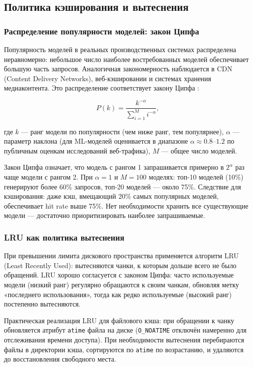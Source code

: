 \subsection{Политика кэширования и вытеснения}

\subsubsection{Распределение популярности моделей: закон Ципфа}

Популярность моделей в реальных производственных системах распределена неравномерно: небольшое число наиболее востребованных моделей обеспечивает большую часть запросов. Аналогичная закономерность наблюдается в CDN (Content Delivery Networks), веб-кэшировании и системах хранения медиаконтента. Это распределение соответствует закону Ципфа \cite{zipf_law}:

\begin{equation}
P(k) = \frac{k^{-\alpha}}{\sum_{i=1}^{M} i^{-\alpha}},
\label{eq:zipf}
\end{equation}

где $k$ --- ранг модели по популярности (чем ниже ранг, тем популярнее), $\alpha$ --- параметр наклона (для ML-моделей оценивается в диапазоне $\alpha \approx 0.8$--$1.2$ по публичным оценкам исследований веб-трафика), $M$ --- общее число моделей.

Закон Ципфа означает, что модель с рангом 1 запрашивается примерно в $2^\alpha$ раз чаще модели с рангом 2. При $\alpha = 1$ и $M = 100$ моделях: топ-10 моделей (10\%) генерируют более 60\% запросов, топ-20 моделей --- около 75\%. Следствие для кэширования: даже кэш, вмещающий 20\% самых популярных моделей, обеспечивает hit rate выше 75\%. Нет необходимости хранить все существующие модели --- достаточно приоритизировать наиболее запрашиваемые.

\subsubsection{LRU как политика вытеснения}

При превышении лимита дискового пространства применяется алгоритм LRU (Least Recently Used): вытесняются чанки, к которым дольше всего не было обращений. LRU хорошо согласуется с законом Ципфа: часто используемые модели (низкий ранг) регулярно обращаются к своим чанкам, обновляя метку «последнего использования», тогда как редко используемые (высокий ранг) постепенно вытесняются.

Практическая реализация LRU для файлового кэша: при обращении к чанку обновляется атрибут \texttt{atime} файла на диске (\texttt{O\_NOATIME} отключён намеренно для отслеживания времени доступа). При необходимости вытеснения перебираются файлы в директории кэша, сортируются по \texttt{atime} по возрастанию, и удаляются до восстановления свободного места.

